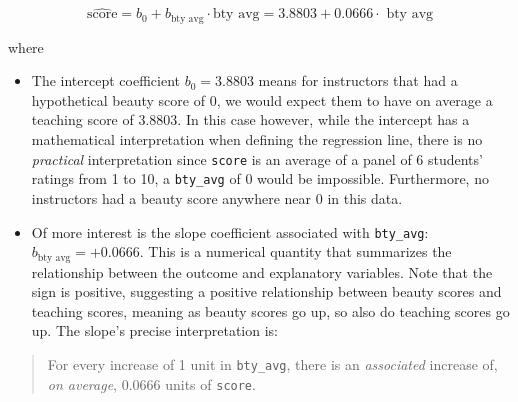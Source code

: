 \documentclass[
  letterpaper,
  DIV=11,
  numbers=noendperiod]{scrreprt}
\theoremstyle{definition}
\theoremstyle{remark}
\begin{document}
\[\widehat{\text{score}} = b_0 + b_{\text{bty avg}} \cdot\text{bty avg} = 3.8803 + 0.0666\cdot\text{ bty avg}\]

where

\begin{itemize}
\item
  The intercept coefficient \(b_0 = 3.8803\) means for instructors that
  had a hypothetical beauty score of 0, we would expect them to have on
  average a teaching score of 3.8803. In this case however, while the
  intercept has a mathematical interpretation when defining the
  regression line, there is no \emph{practical} interpretation since
  \texttt{score} is an average of a panel of 6 students' ratings from 1
  to 10, a \texttt{bty\_avg} of 0 would be impossible. Furthermore, no
  instructors had a beauty score anywhere near 0 in this data.
\item
  Of more interest is the slope coefficient associated with
  \texttt{bty\_avg}: \(b_{\text{bty avg}} = +0.0666\). This is a
  numerical quantity that summarizes the relationship between the
  outcome and explanatory variables. Note that the sign is positive,
  suggesting a positive relationship between beauty scores and teaching
  scores, meaning as beauty scores go up, so also do teaching scores go
  up. The slope's precise interpretation is:
\end{itemize}

\begin{quote}
For every increase of 1 unit in \texttt{bty\_avg}, there is an
\emph{associated} increase of, \emph{on average}, 0.0666 units of
\texttt{score}.
\end{quote}
\end{document}
